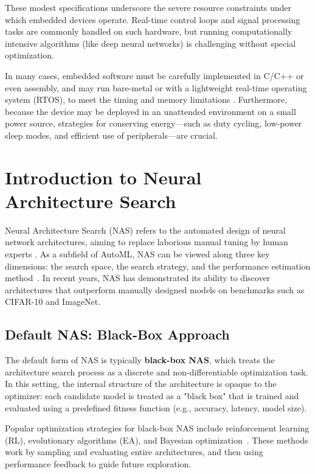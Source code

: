 These modest specifications underscore the severe resource constraints under which embedded devices operate. Real-time control loops and signal processing tasks are commonly handled on such hardware, but running computationally intensive algorithms (like deep neural networks) is challenging without special optimization.

In many cases, embedded software must be carefully implemented in C/C++ or even assembly, and may run bare-metal or with a lightweight real-time operating system (RTOS), to meet the timing and memory limitations \cite{techtarget_embedded_system}. Furthermore, because the device may be deployed in an unattended environment on a small power source, strategies for conserving energy---such as duty cycling, low-power sleep modes, and efficient use of peripherals---are crucial.

\clearpage








\section{Introduction to Neural Architecture Search}
\label{chap:nas}
Neural Architecture Search (NAS) refers to the automated design of neural network architectures, aiming to replace laborious manual tuning by human experts \cite{elsken2019neural}. As a subfield of AutoML, NAS can be viewed along three key dimensions: the search space, the search strategy, and the performance estimation method~\cite{elsken2019neural}. In recent years, NAS has demonstrated its ability to discover architectures that outperform manually designed models on benchmarks such as CIFAR-10 and ImageNet.

\subsection{Default NAS: Black-Box Approach}
The default form of NAS is typically \textbf{black-box NAS}, which treats the architecture search process as a discrete and non-differentiable optimization task. In this setting, the internal structure of the architecture is opaque to the optimizer: each candidate model is treated as a "black box" that is trained and evaluated using a predefined fitness function (e.g., accuracy, latency, model size).

Popular optimization strategies for black-box NAS include reinforcement learning (RL), evolutionary algorithms (EA), and Bayesian optimization~\cite{qiu2023shortest}. These methods work by sampling and evaluating entire architectures, and then using performance feedback to guide future exploration.

